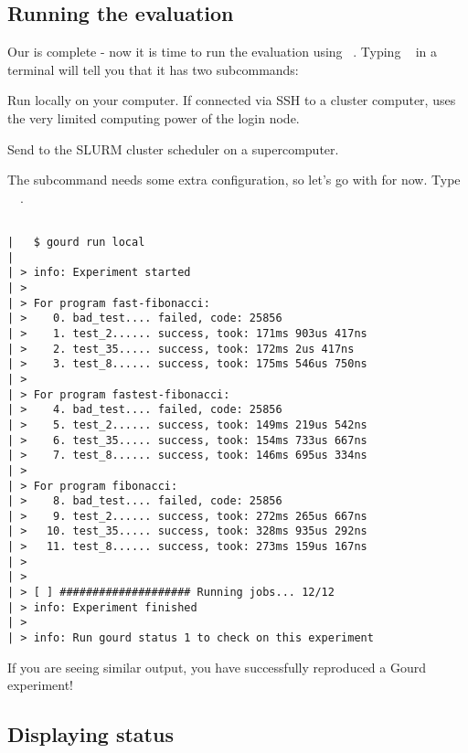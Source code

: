\documentclass[a4paper,english]{article}
\begin{document}
\begin{adjustwidth}{18pt}{0pt}
    \subsection{Running the evaluation}

    Our  is complete - now it is time to run the evaluation
    using ~. Typing ~ in a terminal
    will tell you that it has two subcommands:

    \begin{Description}[subcommands]\setlength{\itemsep}{0cm}
    \item[\Arg{local}] Run locally on your computer. If connected via SSH to a
      cluster computer,  uses the very limited computing power of
      the login node.
    \item[\Arg{slurm}] Send to the SLURM cluster scheduler on a supercomputer.
    \end{Description}

    The  subcommand needs some extra configuration, so let's go with
     for now. Type ~~.

    \begin{verbatim}

|   $ gourd run local
|
| > info: Experiment started
| >
| > For program fast-fibonacci:
| >    0. bad_test.... failed, code: 25856
| >    1. test_2...... success, took: 171ms 903us 417ns
| >    2. test_35..... success, took: 172ms 2us 417ns
| >    3. test_8...... success, took: 175ms 546us 750ns
| >
| > For program fastest-fibonacci:
| >    4. bad_test.... failed, code: 25856
| >    5. test_2...... success, took: 149ms 219us 542ns
| >    6. test_35..... success, took: 154ms 733us 667ns
| >    7. test_8...... success, took: 146ms 695us 334ns
| >
| > For program fibonacci:
| >    8. bad_test.... failed, code: 25856
| >    9. test_2...... success, took: 272ms 265us 667ns
| >   10. test_35..... success, took: 328ms 935us 292ns
| >   11. test_8...... success, took: 273ms 159us 167ns
| >
| >
| > [ ] #################### Running jobs... 12/12
| > info: Experiment finished
| >
| > info: Run gourd status 1 to check on this experiment

    \end{verbatim}

    If you are seeing similar output, you have successfully reproduced a Gourd
    experiment!

    \subsection{Displaying status}


\end{adjustwidth}
\end{document}
